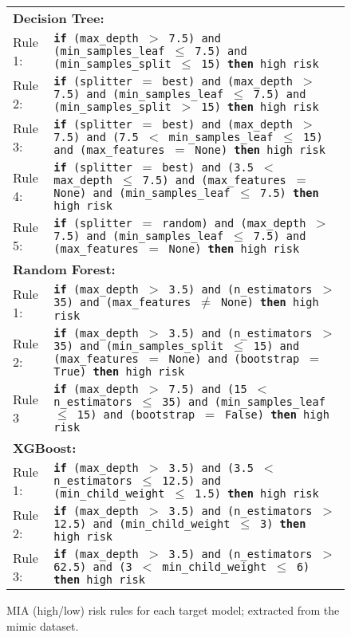 \begin{figure}[t]
    \small
    \centering
    \begin{tabular}{l p{}}
        \toprule
        \multicolumn{2}{l}{{\bf Decision Tree:}} \\
        Rule 1: & \texttt{{\bf if} (max\_depth $>$ 7.5) and (min\_samples\_leaf $\leq$ 7.5) and (min\_samples\_split $\leq$ 15) {\bf then} high risk}\\
        Rule 2: & \texttt{{\bf if} (splitter $=$ best) and  (max\_depth $>$ 7.5) and (min\_samples\_leaf $\leq$ 7.5) and (min\_samples\_split $>$ 15) {\bf then} high risk}\\
        Rule 3: & \texttt{{\bf if} (splitter $=$ best) and (max\_depth $>$ 7.5) and (7.5 $<$ min\_samples\_leaf $\leq$ 15) and (max\_features $=$ None) {\bf then} high risk}\\
        Rule 4: & \texttt{{\bf if} (splitter $=$ best) and  (3.5 $<$ max\_depth $\leq$ 7.5) and (max\_features $=$ None) and (min\_samples\_leaf $\leq$ 7.5) {\bf then} high risk}\\
        Rule 5: & \texttt{{\bf if} (splitter $=$ random) and (max\_depth $>$ 7.5) and (min\_samples\_leaf $\leq$ 7.5) and (max\_features $=$ None) {\bf then} high risk}\\
        \midrule
        \multicolumn{2}{l}{{\bf Random Forest:}} \\
        Rule 1: & \texttt{{\bf if} (max\_depth $>$ 3.5) and (n\_estimators $>$ 35) and  (max\_features $\neq$ None)  {\bf then} high risk}\\
        Rule 2: & \texttt{{\bf if} (max\_depth $>$ 3.5) and (n\_estimators $>$ 35) and (min\_samples\_split $\leq$ 15) and (max\_features $=$ None) and (bootstrap $=$ True) {\bf then} high risk}\\
        Rule 3 & \texttt{{\bf if} (max\_depth $>$ 7.5) and (15 $<$ n\_estimators $\leq$ 35) and (min\_samples\_leaf $\leq$ 15) and (bootstrap $=$ False) {\bf then} high risk}\\
        \midrule
        \multicolumn{2}{l}{{\bf XGBoost:}} \\
        Rule 1: & \texttt{{\bf if} (max\_depth $>$ 3.5) and (3.5 $<$ n\_estimators $\leq$ 12.5) and  (min\_child\_weight $\leq$ 1.5) {\bf then} high risk}\\
        Rule 2: & \texttt{{\bf if} (max\_depth $>$ 3.5) and (n\_estimators $>$ 12.5) and   (min\_child\_weight $\leq$ 3) {\bf then} high risk}\\
        Rule 3: & \texttt{{\bf if} (max\_depth $>$ 3.5) and (n\_estimators $>$ 62.5) and (3 $<$ min\_child\_weight $\leq$ 6) {\bf then} high risk}\\
        \bottomrule
    \end{tabular}
    \caption{MIA (high/low) risk rules for each target model; extracted from the mimic dataset.}%
    \label{fig:rules_combined}
\end{figure}
